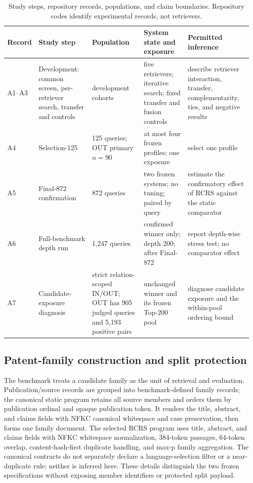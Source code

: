 \documentclass[final,5p,times,twocolumn]{elsarticle}
\newcommand{\RCRS}{RCRS}
\newenvironment{widejournal}{\begin{table}[!t]}{\end{table}}
\newcommand{\journalTableFont}{\footnotesize}
\newenvironment{widejournal}{\begin{table}[!htbp]}{\end{table}}
\newcommand{\journalTableFont}{\footnotesize}
\begin{document}
\begin{widejournal}
\caption{Study steps, repository records, populations, and claim boundaries.
Repository codes identify experimental records, not retrievers.}
\label{tab:protocol}
\centering
\journalTableFont
\renewcommand{\arraystretch}{0.98}
\begin{tabularx}{\textwidth}{@{}P{1.2cm}P{2.3cm}P{2.6cm}P{3.4cm}Y@{}}
\toprule
Record & Study step & Population & System state and exposure & Permitted inference \\
\midrule
\mbox{A1--A3} & Development: common screen, per-retriever search, transfer and controls
& development cohorts & five retrievers; iterative search; fixed transfer and
fusion controls & describe retriever interaction, transfer, complementarity,
ties, and negative results \\
A4 & Selection-125 & 125 queries; OUT primary \(n=90\) & at most four frozen
profiles; one exposure & select one profile \\
A5 & Final-872 confirmation & 872 queries & two frozen systems; no tuning;
paired by query & estimate the confirmatory effect of \RCRS{} against the
static comparator \\
A6 & Full-benchmark depth run & 1,247 queries & confirmed winner only; depth
200; after Final-872 & report depth-wise stress test; no comparator effect \\
A7 & Candidate-exposure diagnosis & strict relation-scoped IN/OUT; OUT has 905
judged queries and 5,193 positive pairs & unchanged winner and its frozen
Top-200 pool & diagnose candidate exposure and the within-pool ordering bound \\
\bottomrule
\end{tabularx}
\end{widejournal}

\subsection{Patent-family construction and split protection}

The benchmark treats a candidate family as the unit of retrieval and
evaluation. Publication/source records are grouped into benchmark-defined
family records; the canonical static program retains all source members and
orders them by publication ordinal and opaque publication token. It renders
the title, abstract, and claims fields with NFKC canonical whitespace and
case preservation, then forms one family document. The selected RCRS program
uses title, abstract, and claims fields with NFKC whitespace normalization,
384-token passages, 64-token overlap, content-hash-first duplicate handling,
and max-p family aggregation. The canonical contracts do not separately
declare a language-selection filter or a near-duplicate rule; neither is
inferred here. These details distinguish the two frozen specifications without
exposing member identifiers or protected split payload.
\end{document}
